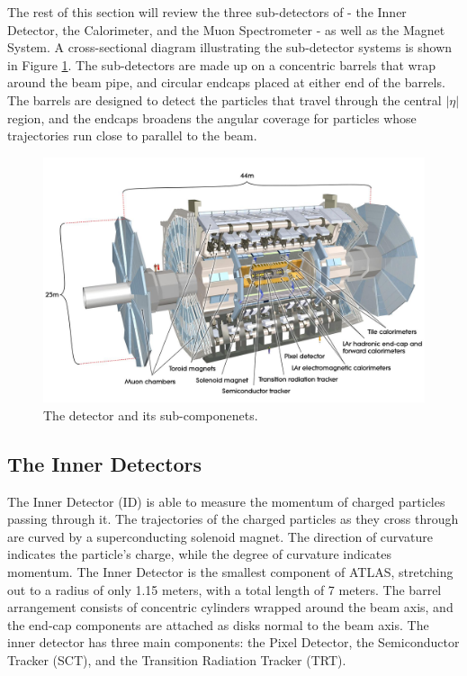 The rest of this section will review the three sub-detectors of \ATLAS - the Inner Detector, the Calorimeter, and the Muon Spectrometer - as well as the Magnet System. A cross-sectional diagram illustrating the sub-detector systems is shown in Figure \ref{fig:atlasdetector}. The sub-detectors are made up on a concentric barrels that wrap around the beam pipe, and circular endcaps placed at either end of the barrels. The barrels are designed to detect the particles that travel through the central $|\eta|$ region, and the endcaps broadens the angular coverage for particles whose trajectories run close to parallel to the beam. 

\begin{figure}
    \centering
    \includegraphics[width=\smallfigwidth]{Figures/LHC/ATLASDetector.jpg}
    \caption{The \ATLAS detector and its sub-componenets.}
    \label{fig:atlasdetector}
\end{figure}

\subsection{The Inner Detectors} \label{ssec:ATLASID}
The Inner Detector (ID) is able to measure the momentum of charged particles passing through it. The trajectories of the charged particles as they cross through are curved by a superconducting solenoid magnet. The direction of curvature indicates the particle's charge, while the degree of curvature indicates momentum. The Inner Detector is the smallest component of ATLAS, stretching out to a radius of only 1.15 meters, with a total length of 7 meters. The barrel arrangement consists of concentric cylinders wrapped around the beam axis, and the end-cap components are attached as disks normal to the beam axis. The inner detector has three main components: the Pixel Detector, the Semiconductor Tracker (SCT), and the Transition Radiation Tracker (TRT).


